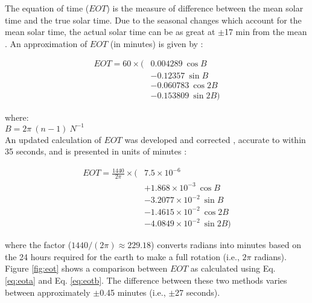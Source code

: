 \noindent The equation of time ($EOT$) is the measure of difference between the mean solar time and the true solar time.  
Due to the seasonal changes which account for the mean solar time, the actual solar time can be as great at $\pm$17 min from the mean \parencite{stine01}.  
An approximation of $EOT$ (in minutes) is given by \parencite[Eq. 1.6]{woolf68}:

\begin{equation}
\label{eq:eota}
	\begin{split}
    	EOT = 60 \times ( & 0.004289 \: \cos B \\
                         & - 0.12357 \: \sin B \\
                         & - 0.060783 \: \cos 2B \\ 
                         & - 0.153809 \: \sin 2B)
	\end{split}
\end{equation}

\noindent where: \\
\indent $B = 2\pi\: (n-1)\: N^{-1}$ \\

An updated calculation of $EOT$ was developed \parencite{spencer71} and corrected \parencite{oglesby98}, accurate to within 35 seconds, and is presented in units of minutes \parencite{iqbal83}:

\begin{equation}
\label{eq:eotb}
	\begin{split}
    	EOT = \frac{1440}{2\pi} \times ( 
    	    & 7.5 \times 10^{-6} \\ 
        	& + 1.868 \times 10^{-3} \: \cos B \\ 
            & - 3.2077 \times 10^{-2} \: \sin B \\
            & - 1.4615 \times 10^{-2} \: \cos 2B \\
            & - 4.0849 \times 10^{-2} \: \sin 2B)
	\end{split}
\end{equation}

\noindent where the factor ($1440/(2\pi) \approx 229.18$) converts radians into minutes based on the 24 hours required for the earth to make a full rotation (i.e., $2\pi$ radians). 
Figure \ref{fig:eot} shows a comparison between $EOT$ as calculated using Eq. \ref{eq:eota} and Eq. \ref{eq:eotb}. 
The difference between these two methods varies between approximately $\pm$0.45 minutes (i.e., $\pm$27 seconds).\\

